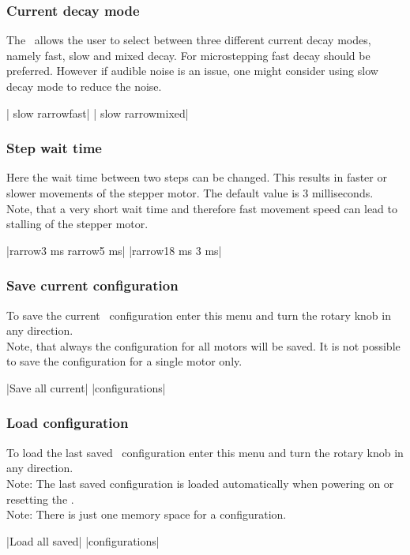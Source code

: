 \subsubsection{Current decay mode}
\label{menu_current_decay}
The \productName ~allows the user to select between three different current decay modes, namely fast, slow and mixed decay. For microstepping fast decay should be preferred. However if audible noise is an issue, one might consider using slow decay mode to reduce the noise.
\begin{center}
  | slow   {rarrow}fast|
             | slow   {rarrow}mixed|
\end{center}


\subsubsection{Step wait time}
\label{menu_step_wait_time}
Here the wait time between two steps can be changed. This results in faster or slower movements of the stepper motor. The default value is 3 milliseconds.\\
Note, that a very short wait time and therefore fast movement speed can lead to stalling of the stepper motor.
\begin{center}
  |{rarrow}3 ms   {rarrow}5 ms|
             |{rarrow}18 ms   3 ms|
\end{center}

\subsubsection{Save current configuration}
\label{menu_save}
To save the current \productName ~configuration enter this menu and turn the rotary knob in any direction.\\
Note, that always the configuration for all motors will be saved. It is not possible to save the configuration for a single motor only.
\begin{center}
  |Save all current|
             |configurations|
\end{center}


\subsubsection{Load configuration}
\label{chp:menu_load}
To load the last saved \productName ~configuration enter this menu and turn the rotary knob in any direction.\\
Note: The last saved configuration is loaded automatically when powering on or resetting the \productName.\\
Note: There is just one memory space for a configuration.
\begin{center}
  |Load all saved|
             |configurations|
\end{center}



